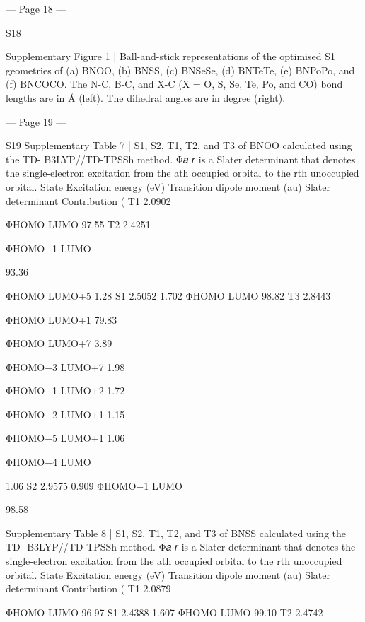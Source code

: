 


--- Page 18 ---
 
S18 
 
Supplementary Figure 1 | Ball-and-stick representations of the optimised S1 geometries of 
(a) BNOO, (b) BNSS, (c) BNSeSe, (d) BNTeTe, (e) BNPoPo, and (f) BNCOCO. The N-C, 
B-C, and X-C (X = O, S, Se, Te, Po, and CO) bond lengths are in Å (left). The dihedral 
angles are in degree (right).  
 
 


--- Page 19 ---
 
S19 
Supplementary Table 7 | S1, S2, T1, T2, and T3 of BNOO calculated using the TD-
B3LYP//TD-TPSSh method. Φ𝑎
𝑟 is a Slater determinant that denotes the single-electron 
excitation from the ath occupied orbital to the rth unoccupied orbital. 
State 
Excitation 
energy (eV) 
Transition dipole  
moment (au) 
Slater 
determinant 
Contribution (%
T1 
2.0902 
 
ΦHOMO
LUMO       
97.55 
T2 
2.4251 
 
ΦHOMO−1
LUMO
 
93.36 
 
 
 
ΦHOMO
LUMO+5 
1.28 
S1 
2.5052 
1.702 
ΦHOMO
LUMO 
98.82 
T3 
2.8443 
 
ΦHOMO
LUMO+1 
79.83 
 
 
 
ΦHOMO
LUMO+7 
3.89 
 
 
 
ΦHOMO−3
LUMO+7 
1.98 
 
 
 
ΦHOMO−1
LUMO+2 
1.72 
 
 
 
ΦHOMO−2
LUMO+1 
1.15 
 
 
 
ΦHOMO−5
LUMO+1 
1.06 
 
 
 
ΦHOMO−4
LUMO
 
1.06 
S2 
2.9575 
0.909 
ΦHOMO−1
LUMO
 
98.58 
 
 
Supplementary Table 8 | S1, S2, T1, T2, and T3 of BNSS calculated using the TD-
B3LYP//TD-TPSSh method. Φ𝑎
𝑟 is a Slater determinant that denotes the single-electron 
excitation from the ath occupied orbital to the rth unoccupied orbital. 
State 
Excitation 
energy (eV) 
Transition dipole  
moment (au) 
Slater 
determinant 
Contribution (%
T1 
2.0879 
 
ΦHOMO
LUMO       
96.97 
S1 
2.4388 
1.607 
ΦHOMO
LUMO 
99.10 
T2 
2.4742 
 
